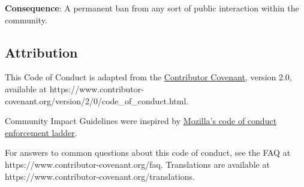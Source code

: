 \textbf{Consequence}: A permanent ban from any sort of public
interaction within the community.

\subsection{Attribution}\label{attribution}

This Code of Conduct is adapted from the
\href{https://www.contributor-covenant.org}{Contributor Covenant},
version 2.0, available at
https://www.contributor-covenant.org/version/2/0/code\_of\_conduct.html.

Community Impact Guidelines were inspired by
\href{https://github.com/mozilla/diversity}{Mozilla's code of conduct
enforcement ladder}.

For answers to common questions about this code of conduct, see the FAQ
at https://www.contributor-covenant.org/faq. Translations are available
at https://www.contributor-covenant.org/translations.
